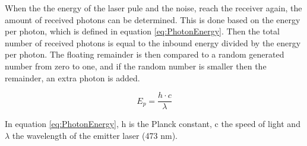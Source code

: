 When the the energy of the laser pule and the noise, reach the receiver again, the amount of received photons can be determined. This is done based on the energy per photon, which is defined in equation \ref{eq:PhotonEnergy}. Then the total number of received photons is equal to the inbound energy divided by the energy per photon. The floating remainder is then compared to a random generated number from zero to one, and if the random number is smaller then the remainder, an extra photon is added.

\begin{equation}
	E_{p}=\frac{h \cdot c}{\lambda}
	\label{eq:PhotonEnergy}
\end{equation}

In equation \ref{eq:PhotonEnergy}, h is the Planck constant, c the speed of light and $\lambda$ the wavelength of the emitter laser (473 nm).
